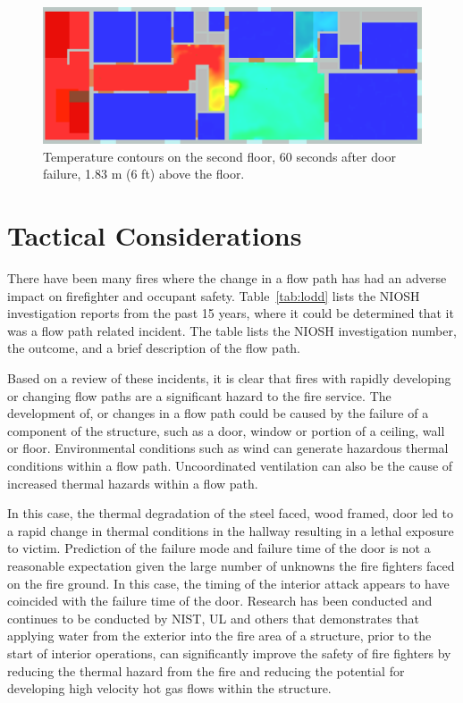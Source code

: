 \documentclass[11pt,oneside]{book}
\begin{document}
\begin{figure}[h!]
\centering
\includegraphics[width=.7\textwidth]{../Figures/west_50th_baseline_top_220_6ft}
 

\caption{Temperature contours on the second floor, 60 seconds after door failure, 1.83 m (6 ft) above the floor.}
\label{fig:temp_top_220}
\end{figure}


\section{Tactical Considerations}
There have been many fires where the change in a flow path has had an adverse impact on firefighter and occupant safety. Table~\ref{tab:lodd} lists the NIOSH investigation reports from the past 15 years, where it could be determined that it was a flow path related incident. The table lists the NIOSH investigation number, the outcome, and a brief description of the flow path. 

Based on a review of these incidents, it is clear that fires with rapidly developing or changing flow paths are a significant hazard to the fire service. The development of, or changes in a flow path could be caused by the failure of a component of the structure, such as a door, window or portion of a ceiling, wall or floor. Environmental conditions such as wind can generate hazardous thermal conditions within a flow path. Uncoordinated ventilation can also be the cause of increased thermal hazards within a flow path. 

In this case, the thermal degradation of the steel faced, wood framed, door led to a rapid change in thermal conditions in the hallway resulting in a lethal exposure to victim.  Prediction of the failure mode and failure time of the door is not a reasonable expectation given the large number of unknowns the fire fighters faced on the fire ground.  In this case, the timing of the interior attack appears to have coincided with the failure time of the door. Research has been conducted \cite{madrzykowski2009fire, kerber2009fire} and continues to be conducted by NIST, UL and others that demonstrates that applying water from the exterior into the fire area of a structure, prior to the start of interior operations, can significantly improve the safety of fire fighters by reducing the thermal hazard from the fire and reducing the potential for developing high velocity hot gas flows within the structure.
\end{document}
